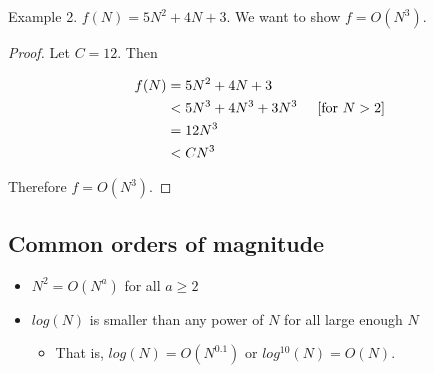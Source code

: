 \documentclass[12pt]{article}
\begin{document}
Example 2. $f(N) = 5N^2 + 4N + 3$. We want to show $f = O(N^3)$.

\begin{proof}
Let $C = 12$. Then

\begin{align*}
f(N) &= 5N^2 + 4N + 3 \\
&< 5N^3 + 4N^3 + 3N^3 \hspace{5mm} [\textnormal{for $N > 2$}] \\
&= 12N^3 \\
&< CN^3
\end{align*}

Therefore $f = O(N^3)$.

\end{proof}

\subsection{Common orders of magnitude}

\begin{itemize}
\item $N^2 = O(N^a)$ for all $a \geq 2$
\item $log(N)$ is smaller than any power of $N$ for all large enough $N$

\begin{itemize}
\item That is, $log(N) = O(N^{0.1})$ or $log^{10}(N) = O(N)$.
\end{itemize}

\end{itemize}
\end{document}
